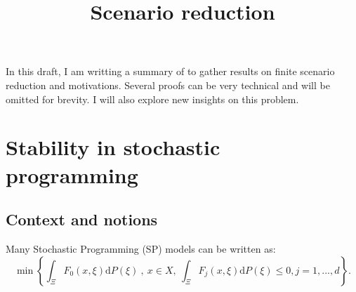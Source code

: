 \documentclass{amsart}
\title{Scenario reduction}
\begin{document}
\LinesNumbered
{}
\maketitle
In this draft, I am writting a summary of \cite{rujeerapaiboon_scenario_2022} to gather results on finite scenario reduction and motivations. Several proofs can be very technical and will be omitted for brevity. I will also explore new insights on this problem.

\section{Stability in stochastic programming}\label{stability}
\subsection{Context and notions}
Many Stochastic Programming (SP) models can be written as:
\begin{equation}\label{stochastic}
\min\left\{\int_\Xi F_0\left(x,\xi\right)\text{d}P\left(\xi\right)\:,\: x\in X, \: \int_\Xi F_j\left(x,\xi\right)\text{d}P\left(\xi\right)\leq0, j=1,...,d\right\}.
\end{equation}
\end{document}
